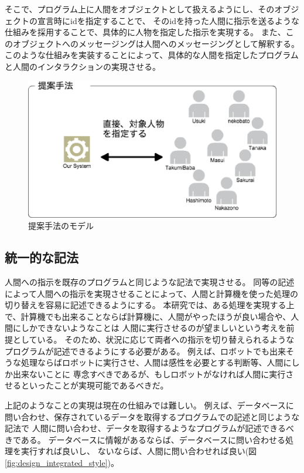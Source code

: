 そこで、プログラム上に人間をオブジェクトとして扱えるようにし、そのオブジェクトの宣言時にidを指定することで、
そのidを持った人間に指示を送るような仕組みを採用することで、具体的に人物を指定した指示を実現する。
また、このオブジェクトへのメッセージングは人間へのメッセージングとして解釈する。
このような仕組みを実装することによって、具体的な人間を指定したプログラムと人間のインタラクションの実現させる。

\begin{figure}[htbp]
  \begin{center}
  \includegraphics[width=.5\linewidth]{images/unique_id_model.eps}
  \end{center}
  \caption{提案手法のモデル}
  \label{fig:unique_id_model}
\end{figure}

\subsection{統一的な記法}\label{ux7d71ux4e00ux7684ux306aux8a18ux6cd5}

人間への指示を既存のプログラムと同じような記法で実現させる。
同等の記述によって人間への指示を実現させることによって、人間と計算機を使った処理の切り替えを容易に記述できるようにする。
本研究では、ある処理を実現する上で、計算機でも出来ることならば計算機に、人間がやったほうが良い場合や、人間にしかできないようなことは
人間に実行させるのが望ましいという考えを前提としている。
そのため、状況に応じて両者への指示を切り替えられるようなプログラムが記述できるようにする必要がある。
例えば、ロボットでも出来そうな処理ならばロボットに実行させ、人間は感性を必要とする判断等、人間にしか出来ないことに
専念すべきであるが、もしロボットがなければ人間に実行させるといったことが実現可能であるべきだ。

上記のようなことの実現は現在の仕組みでは難しい。
例えば、データベースに問い合わせ、保存されているデータを取得するプログラムでの記述と同じような記法で
人間に問い合わせ、データを取得するようなプログラムが記述できるべきである。
データベースに情報があるならば、データベースに問い合わせる処理を実行すれば良いし、
ないならば、人間に問い合わせれば良い(図\ref{fig:design_integrated_style})。

